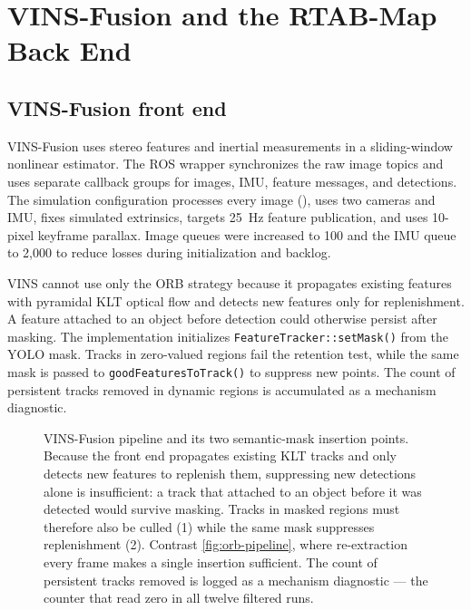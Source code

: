 \section{VINS-Fusion and the RTAB-Map Back End}
\label{sec:vins-rtab-method}

\subsection{VINS-Fusion front end}

VINS-Fusion uses stereo features and inertial measurements in a sliding-window
nonlinear estimator. The ROS wrapper synchronizes the raw image topics and uses
separate callback groups for images, IMU, feature messages, and detections. The
simulation configuration processes every image (), uses two
cameras and IMU, fixes simulated extrinsics, targets \SI{25}{\hertz} feature
publication, and uses 10-pixel keyframe parallax. Image queues were increased to
100 and the IMU queue to 2,000 to reduce losses during initialization and backlog.

VINS cannot use only the ORB strategy because it propagates existing features
with pyramidal KLT optical flow and detects new features only for replenishment.
A feature attached to an object before detection could otherwise persist after
masking. The implementation initializes \texttt{FeatureTracker::setMask()} from
the YOLO mask. Tracks in zero-valued regions fail the retention test, while the
same mask is passed to \texttt{goodFeaturesToTrack()} to suppress new points. The
count of persistent tracks removed in dynamic regions is accumulated as a
mechanism diagnostic.

\begin{figure}[htbp]
  \centering
  \resizebox{\textwidth}{!}{}
  \caption{VINS-Fusion pipeline and its two semantic-mask insertion points.
  Because the front end propagates existing KLT tracks and only detects new
  features to replenish them, suppressing new detections alone is insufficient:
  a track that attached to an object before it was detected would survive
  masking. Tracks in masked regions must therefore also be culled (1) while the
  same mask suppresses replenishment (2). Contrast \cref{fig:orb-pipeline},
  where re-extraction every frame makes a single insertion sufficient. The count
  of persistent tracks removed is logged as a mechanism diagnostic --- the
  counter that read zero in all twelve filtered runs.}
  \label{fig:vins-pipeline}
\end{figure}

